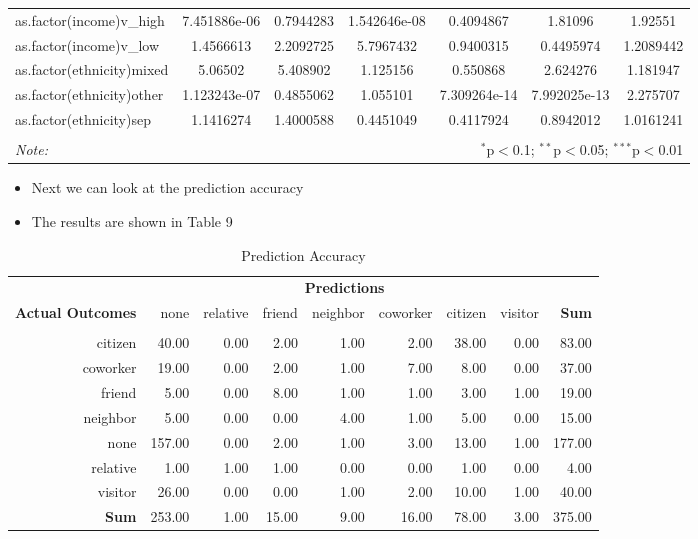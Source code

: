 \documentclass[12pt,letterpaper]{article}
\begin{document}
\begin{table}[!htbp]
\begin{adjustbox}{max width=\textwidth}
\begin{tabular}{@{\extracolsep{5pt}}lcccccc}
			as.factor(income)v\_high & 7.451886e-06 & 0.7944283 & 1.542646e-08 & 0.4094867 & 1.81096 & 1.92551 \\
			as.factor(income)v\_low & 1.4566613 & 2.2092725 & 5.7967432 & 0.9400315 & 0.4495974 & 1.2089442 \\
			as.factor(ethnicity)mixed & 5.06502 & 5.408902 & 1.125156 & 0.550868 & 2.624276 & 1.181947 \\
			as.factor(ethnicity)other & 1.123243e-07 & 0.4855062 & 1.055101 & 7.309264e-14 & 7.992025e-13 & 2.275707 \\
			as.factor(ethnicity)sep & 1.1416274 & 1.4000588 & 0.4451049 & 0.4117924 & 0.8942012 & 1.0161241 \\
			\hline 
			\hline \\[-1.8ex] 
			\textit{Note:}  & \multicolumn{6}{r}{$^{*}$p$<$0.1; $^{**}$p$<$0.05; $^{***}$p$<$0.01} \\ 
		\end{tabular} 
	\end{adjustbox} 
\end{table} 


\begin{itemize}
	\item Next we can look at the prediction accuracy
		
	\item The results are shown in Table 9
\end{itemize}

\newpage
\begin{table}[!htbp]
	\centering
	\caption{Prediction Accuracy}
	\label{tab:confusion_matrix}
	\begin{tabular}{rrrrrrrrr}
		\hline
		& \multicolumn{7}{c}{\textbf{Predictions}} \\
		\cline{2-8}
		\multirow{2}{*}{\textbf{Actual Outcomes}} & none & relative & friend & neighbor & coworker & citizen & visitor & \textbf{Sum} \\
		& & & & & & & & \\
		\hline
		citizen   & 40.00 & 0.00 & 2.00 & 1.00 & 2.00 & 38.00 & 0.00 & 83.00 \\
		coworker  & 19.00 & 0.00 & 2.00 & 1.00 & 7.00 & 8.00 & 0.00 & 37.00 \\
		friend    & 5.00  & 0.00 & 8.00 & 1.00 & 1.00 & 3.00 & 1.00 & 19.00 \\
		neighbor  & 5.00  & 0.00 & 0.00 & 4.00 & 1.00 & 5.00 & 0.00 & 15.00 \\
		none      & 157.00& 0.00 & 2.00 & 1.00 & 3.00 & 13.00& 1.00 & 177.00 \\
		relative  & 1.00  & 1.00 & 1.00 & 0.00 & 0.00 & 1.00 & 0.00 & 4.00 \\
		visitor   & 26.00 & 0.00 & 0.00 & 1.00 & 2.00 & 10.00& 1.00 & 40.00 \\
		\hline
		\textbf{Sum} & 253.00 & 1.00 & 15.00 & 9.00 & 16.00 & 78.00 & 3.00 & 375.00 \\
		\hline
	\end{tabular}
\end{table}
\end{document}
